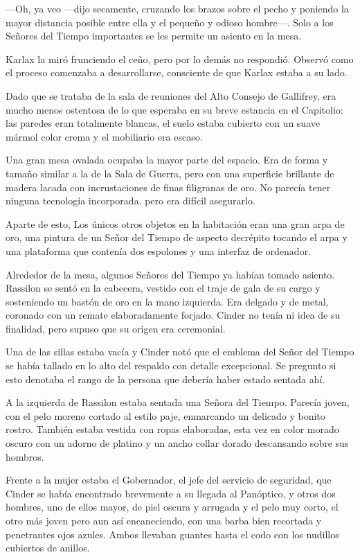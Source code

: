 —Oh, ya veo —dijo secamente, cruzando los brazos sobre el pecho y poniendo la mayor distancia posible entre ella y el pequeño y odioso hombre—. Solo a los Señores del Tiempo importantes se les permite un asiento en la mesa.

Karlax la miró frunciendo el ceño, pero por lo demás no respondió. Observó como el proceso comenzaba a desarrollarse, consciente de que Karlax estaba a su lado.

Dado que se trataba de la sala de reuniones del Alto Consejo de Gallifrey, era mucho menos ostentosa de lo que esperaba en su breve estancia en el Capitolio: las paredes eran totalmente blancas, el suelo estaba cubierto con un suave mármol color crema y el mobiliario era escaso.

Una gran mesa ovalada ocupaba la mayor parte del espacio. Era de forma y tamaño similar a la de la Sala de Guerra, pero con una superficie brillante de madera lacada con incrustaciones de finas filigranas de oro. No parecía tener ninguna tecnología incorporada, pero era difícil asegurarlo.

Aparte de esto, Los únicos otros objetos en la habitación eran una gran arpa de oro, una pintura de un Señor del Tiempo de aspecto decrépito tocando el arpa y una plataforma que contenía dos espolones y una interfaz de ordenador.

Alrededor de la mesa, algunos Señores del Tiempo ya habían tomado asiento. Rassilon se sentó en la cabecera, vestido con el traje de gala de su cargo y sosteniendo un bastón de oro en la mano izquierda. Era delgado y de metal, coronado con un remate elaboradamente forjado. Cinder no tenía ni idea de su finalidad, pero supuso que su origen era ceremonial.

Una de las sillas estaba vacía y Cinder notó que el emblema del Señor del Tiempo se había tallado en lo alto del respaldo con detalle excepcional. Se pregunto si esto denotaba el rango de la persona que debería haber estado sentada ahí.

A la izquierda de Rassilon estaba sentada una Señora del Tiempo. Parecía joven, con el pelo moreno cortado al estilo paje, enmarcando un delicado y bonito rostro. También estaba vestida con ropas elaboradas, esta vez en color morado oscuro con un adorno de platino y un ancho collar dorado descansando sobre sus hombros.

Frente a la mujer estaba el Gobernador, el jefe del servicio de seguridad, que Cinder se había encontrado brevemente a su llegada al Panóptico, y otros dos hombres, uno de ellos mayor, de piel oscura y arrugada y el pelo muy corto, el otro más joven pero aun así encaneciendo, con una barba bien recortada y penetrantes ojos azules. Ambos llevaban guantes hasta el codo con los nudillos cubiertos de anillos.

